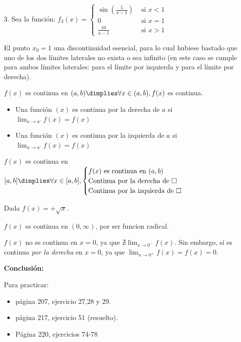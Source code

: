 \begin{example}
3. Sea la función: $f_3(x)=\left\{\begin{matrix}\sin\left(\frac{5}{x-1}\right) & \mbox{ si } x<1 \\ 0 & \mbox{ si } x=1 \\ \frac{10}{x-1}& \mbox{ si } x>1\end{matrix}\right.$

El punto $x_0=1$  una discontinuidad esencial, para lo cual hubiese bastado que uno de los dos límites laterales no exista o sea infinito (en este caso se cumple para ambos límites laterales: para el límite por izquierda y para el límite por derecha).
\end{example}

\begin{defn}

	$f(x)$ es continua en $(a,b) \dimplies \forall x\in(a,b), f(x)$ es continua.
\end{defn}


\begin{defn}
	\begin{itemize}
		\item Una función $(x)$ es continua por la derecha de $a$ si $\displaystyle\lim_{x\to a^\square}f(x) = f(x)$
		\item Una función $(x)$ es continua por la izquierda de $a$ si $\displaystyle\lim_{x\to a^\square} f(x) = f(x)$
	\end{itemize}
\end{defn}

\begin{defn}

$f(x)$ es continua en $[a,b] \dimplies \forall x\in[a,b],\begin{cases} f(x) \text{ es continua en } (a,b)\\
\text{Continua por la derecha de } \square\\
\text{Continua por la izquierda de } \square\\\end{cases}$
\end{defn}
\vspace{-0.5cm}

\begin{example}
Dada $f(x) = +\sqrt{x}$.

$f(x)$ es continua en $(0,\infty)$, por ser funcion radical. 

$f(x)$ no es continua en $x=0$, ya que $\nexists\displaystyle\lim_{x\to 0^-}f(x)$. 
%
Sin embargo, sí es continua \textit{por la derecha} en $x=0$, ya que $\displaystyle\lim_{x\to 0^+} f(x) = f(x) = 0$. 

\textbf{Conclusión:}
\vspace{3cm}
\end{example}


Para practicar: 
\begin{itemize}
	\item página 207, ejercicio 27,28 y 29.
	\item página 217, ejercicio 51 (resuelto).
	\item Página 220, ejercicios 74-78
\end{itemize}